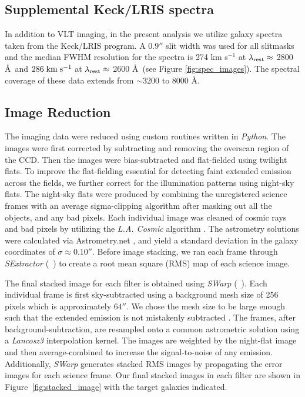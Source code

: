 \documentclass[twocolumn]{aastex61}
\newcommand{\citeth}[1]{(\citeauthor{#1}\ \citeyear{#1})}
\def \mkms {{\rm \; km\;s^{-1}}}
\begin{document}
\subsection{Supplemental Keck/LRIS spectra}
In addition to VLT imaging, in the present analysis we utilize galaxy spectra taken from the \cite{Rubin_2014} Keck/LRIS program.  A $0.9''$ slit width was used for all slitmasks and the median FWHM resolution for the spectra is 274 km s$^{-1}$ at $\lambda_{\rm rest} \approx$ 2800 \AA\ and $286\mkms$  at $\lambda_{\rm rest}\approx$ 2600 \AA\ (see Figure \ref{fig:spec_images}).  The spectral coverage of these data extends from ${\sim}3200$ to 8000 \AA.

\subsection{Image Reduction}
The imaging data were reduced using custom routines written in \emph{Python}. 
The images were first corrected by subtracting and removing the overscan region of the CCD. 
Then the images were bias-subtracted and flat-fielded using twilight flats.
To improve the flat-fielding essential for detecting faint extended emission across the fields, we further correct for the illumination patterns using night-sky flats. The night-sky flats were produced by combining the unregistered science frames with an average sigma-clipping algorithm after masking out all the objects, and any bad pixels. Each individual image was cleaned of cosmic rays and bad pixels by utilizing the \emph{L.A. Cosmic} algorithm \citep{Dokkum2001}.
The astrometry solutions were calculated via Astrometry.net \citep{Lang}, and yield a standard deviation in the galaxy coordinates of $\sigma \approx 0.10''$. Before image stacking, we ran each frame through \emph{SExtractor} \citeth{Bertin} to create a root mean square (RMS) map of each science image.


The final stacked image for each filter is obtained using \emph{SWarp} \citeth{Bertin}.
Each individual frame is first sky-subtracted using a background mesh size of 256 pixels which is approximately $64''$. 
We chose the mesh size to be large enough such that the extended emission is not mistakenly subtracted \citep[e.g.,][]{Battaia_2015}. 
The frames, after background-subtraction, are resampled onto a common astrometric solution using a \textit{Lancosz3} interpolation kernel. 
The images are weighted by the night-flat image and then  average-combined to increase the signal-to-noise of any  emission. Additionally, \emph{SWarp} generates stacked RMS images by propagating the error images for each science frame.
Our final stacked images in each filter are shown in Figure~\ref{fig:stacked_image} with the target galaxies indicated.  
\end{document}
